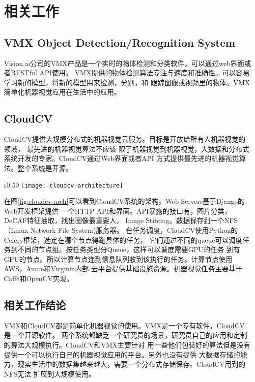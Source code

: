 \section{相关工作}
\label{sec:related_work}

\subsection{VMX Object Detection/Recognition System}
Vision.ai公司的VMX产品是一个实时的物体检测和分类软件，可以通过web界面或者RESTful API使用。
VMX提供的物体检测算法专注与速度和准确性。可以容易学习新的模型，将新的模型用来检测，分别，和
跟踪图像或视频里的物体。VMX简单化机器视觉应用在生活中的应用。

\subsection{CloudCV}
CloudCV提供大规模分布式的机器视觉云服务。目标是开放给所有人机器视觉的领域，
最先进的机器视觉算法不应该
限于机器视觉到机器视觉，大数据和分布式系统开发的专家。CloudCV通过Web界面或者API
方式提供最先进的机器视觉算法。整个系统是开源。\cite{cloudcv2015}

\begin{wrapfigure}{r}{0.50\textwidth}
  \centering
    \texttt{[image: cloudcv-architecture]}
    \caption{CloudCV系统架构。\cite{cloudcv2015}}
  \label{fig:cloudcv-arch}
\end{wrapfigure}
在图\ref{fig:cloudcv-arch}可以看到CloudCV系统的架构。Web Servers基于Django的Web开发框架提供
一个HTTP API和界面。API暴露的接口有，图片分类，DeCAF特征抽取，找出图像最重要人，
Image Stitcing。数据保存到一个NFS（Linux Network File System)服务器。
在任务调度，CloudCV使用Python的Celery框架，选定在哪个节点得跑具体的任务。
它们通过不同的queue可以调度任务到不同的节点组。按任务类型分Queue，这样可以调度需要GPU的任务
到有GPU的节点。所以计算节点连到信息队列收到该执行的任务。计算节点使用AWS，Azure和Virginia内部
云平台提供基础设施资源。机器视觉任务主要基于Caffe和OpenCV实现。

\subsection{相关工作结论}
VMX和CloudCV都是简单化机器视觉的使用。VMX是一个专有软件，CloudCV是一个开源软件。
两个系统都缺乏一个研究员的场景，研究员自己的应用和定制的算法大规模执行。CloudCV和VMX主要针对
用一些他们包装好的算法但是没有提供一个可以执行自己的机器视觉应用的平台。另外也没有提供
大数据存储的能力，现实生活中的数据集越来越大，需要一个分布式存储保存。CloudCV用到的NFS无法
扩展到大规模使用。

